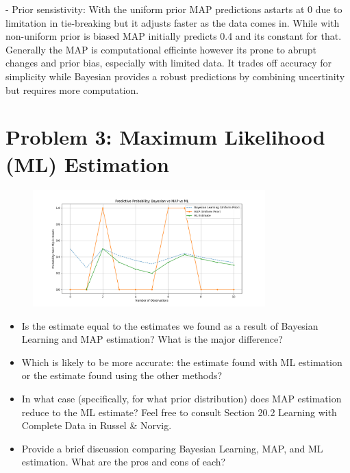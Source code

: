 \documentclass{article}
\begin{document}
- Prior sensistivity: With the uniform prior MAP predictions astarts at 0 due to limitation in tie-breaking but it adjusts faster as the data comes in. While with non-uniform
prior is biased  MAP initially predicts 0.4 and its constant for that. \\

Generally the MAP is computational efficinte however its prone to abrupt changes and prior bias, especially with limited data. It trades off accuracy for simplicity while Bayesian provides a robust predictions
by combining uncertinity but requires more computation.


\clearpage

\section*{Problem 3: Maximum Likelihood (ML) Estimation}
\begin{figure}[H]
    \centering
    \includegraphics[width=0.8\textwidth]{../Problem3/Comparizon_ML_MAP_Bayesian.png}
    \label{fig:num_of_observation}
\end{figure}
\begin{itemize}
    \item Is the estimate equal to the estimates we found as a result of Bayesian Learning and MAP estimation? What is the major difference?
    \item Which is likely to be more accurate: the estimate found with ML estimation or the estimate found using the other methods?
    \item In what case (specifically, for what prior distribution) does MAP estimation reduce to the ML estimate? Feel free to consult Section 20.2 Learning with Complete Data in Russel \& Norvig.
    \item Provide a brief discussion comparing Bayesian Learning, MAP, and ML estimation. What are the pros and cons of each?
\end{itemize}
\end{document}
